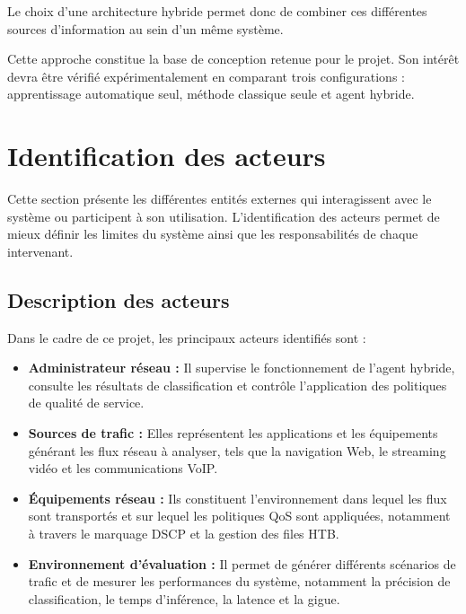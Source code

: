 Le choix d'une architecture hybride permet donc de combiner ces
différentes sources d'information au sein d'un même système.

Cette approche constitue la base de conception retenue pour le
projet. Son intérêt devra être vérifié expérimentalement en
comparant trois configurations : apprentissage automatique seul,
méthode classique seule et agent hybride.


\section{Identification des acteurs}

Cette section présente les différentes entités externes qui
interagissent avec le système ou participent à son utilisation.
L'identification des acteurs permet de mieux définir les limites
du système ainsi que les responsabilités de chaque intervenant.

\subsection{Description des acteurs}

Dans le cadre de ce projet, les principaux acteurs identifiés sont :

\begin{itemize}
    \item \textbf{Administrateur réseau :}
    Il supervise le fonctionnement de l'agent hybride, consulte
    les résultats de classification et contrôle l'application
    des politiques de qualité de service.

    \item \textbf{Sources de trafic :}
    Elles représentent les applications et les équipements
    générant les flux réseau à analyser, tels que la navigation
    Web, le streaming vidéo et les communications VoIP.

    \item \textbf{Équipements réseau :}
    Ils constituent l'environnement dans lequel les flux sont
    transportés et sur lequel les politiques QoS sont appliquées,
    notamment à travers le marquage DSCP et la gestion des files HTB.

    \item \textbf{Environnement d'évaluation :}
    Il permet de générer différents scénarios de trafic et de
    mesurer les performances du système, notamment la précision
    de classification, le temps d'inférence, la latence et la gigue.
\end{itemize}


